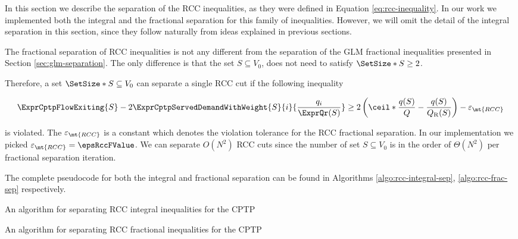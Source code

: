 In this section we describe the separation of the RCC inequalities, as they were defined in Equation \eqref{eq:rcc-inequality}.
In our work we implemented both the integral and the fractional separation for this family of inequalities.
However, we will omit the detail of the integral separation in this section, since they follow naturally from ideas explained in previous sections.

The fractional separation of RCC inequalities is not any different from the separation of the GLM fractional inequalities presented in Section \ref{sec:glm-separation}.
The only difference is that the set $S \subseteq V_0$, does not need to satisfy $\SetSize*{S} \ge 2$.

Therefore, a set $\SetSize*{S} \subseteq V_0$ can separate a single RCC cut if the following inequality

\begin{equation}
	\begin{split}
		\ExprCptpFlowExiting{S} -2 \ExprCptpServedDemandWithWeight{S}{i}{\frac{q_i}{\ExprQr(S)}}    \ge   2 \left( \ceil*{ \frac{q(S)}{Q}} - \frac{q(S)}{Q_{\mathrm{R}}(S)} \right) - \varepsilon_{\mt{RCC}}
	\end{split}
\end{equation}

is violated.
The $\varepsilon_{\mt{RCC}}$ is a constant which denotes the violation tolerance for the RCC fractional separation.
In our implementation we picked $\varepsilon_{\mt{RCC}} = \epsRccFValue$.
We can separate $O(N^2)$ RCC cuts since the number of set $S \subseteq V_0$ is in the order of $\Theta(N^2)$ per fractional separation iteration.

The complete pseudocode for both the integral and fractional separation can be found in Algorithms \ref{algo:rcc-integral-sep}, \ref{algo:rcc-frac-sep} respectively.

\begin{algorithm}
	\caption{An algorithm for separating RCC integral inequalities for the CPTP}
	\label{algo:rcc-integral-sep}
	
\end{algorithm}

\begin{algorithm}
	\caption{An algorithm for separating RCC fractional inequalities for the CPTP}
	\label{algo:rcc-frac-sep}
	
\end{algorithm}

